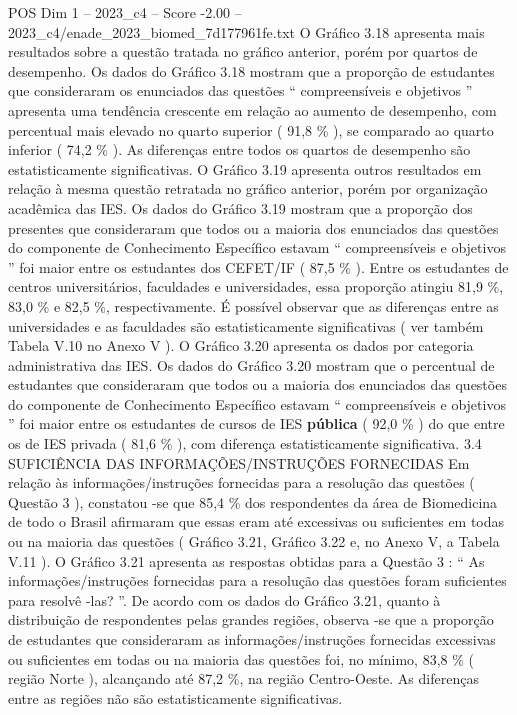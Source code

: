\begin{textsample}{POS Dim 1 – 2023\_c4 – Score -2.00 – 2023\_c4/enade\_2023\_biomed\_7d177961fe.txt}
O Gráfico 3.18 apresenta mais resultados sobre a questão tratada no gráfico anterior, porém por quartos de desempenho.
Os dados do Gráfico 3.18 mostram que a proporção de estudantes que consideraram os enunciados das questões “ compreensíveis e objetivos ” apresenta uma tendência crescente em relação ao aumento de desempenho, com percentual mais elevado no quarto superior ( 91,8 \% ), se comparado ao quarto inferior ( 74,2 \% ).
As diferenças entre todos os quartos de desempenho são estatisticamente significativas.
O Gráfico 3.19 apresenta outros resultados em relação à mesma questão retratada no gráfico anterior, porém por organização acadêmica das IES.
Os dados do Gráfico 3.19 mostram que a proporção dos presentes que consideraram que todos ou a maioria dos enunciados das questões do componente de Conhecimento Específico estavam “ compreensíveis e objetivos ” foi maior entre os estudantes dos CEFET/IF ( 87,5 \% ).
Entre os estudantes de centros universitários, faculdades e universidades, essa proporção atingiu 81,9 \%, 83,0 \% e 82,5 \%, respectivamente.
É possível observar que as diferenças entre as universidades e as faculdades são estatisticamente significativas ( ver também Tabela V.10 no Anexo V ).
O Gráfico 3.20 apresenta os dados por categoria administrativa das IES.
Os dados do Gráfico 3.20 mostram que o percentual de estudantes que consideraram que todos ou a maioria dos enunciados das questões do componente de Conhecimento Específico estavam “ compreensíveis e objetivos ” foi maior entre os estudantes de cursos de IES \textbf{pública} ( 92,0 \% ) do que entre os de IES privada ( 81,6 \% ), com diferença estatisticamente significativa. 3.4 SUFICIÊNCIA DAS INFORMAÇÕES/INSTRUÇÕES FORNECIDAS Em relação às informações/instruções fornecidas para a resolução das questões ( Questão 3 ), constatou -se que 85,4 \% dos respondentes da área de Biomedicina de todo o Brasil afirmaram que essas eram até excessivas ou suficientes em todas ou na maioria das questões ( Gráfico 3.21, Gráfico 3.22 e, no Anexo V, a Tabela V.11 ).
O Gráfico 3.21 apresenta as respostas obtidas para a Questão 3 : “ As informações/instruções fornecidas para a resolução das questões foram suficientes para resolvê -las? ”.
De acordo com os dados do Gráfico 3.21, quanto à distribuição de respondentes pelas grandes regiões, observa -se que a proporção de estudantes que consideraram as informações/instruções fornecidas excessivas ou suficientes em todas ou na maioria das questões foi, no mínimo, 83,8 \% ( região Norte ), alcançando até 87,2 \%, na região Centro-Oeste.
As diferenças entre as regiões não são estatisticamente significativas.

\end{textsample}
